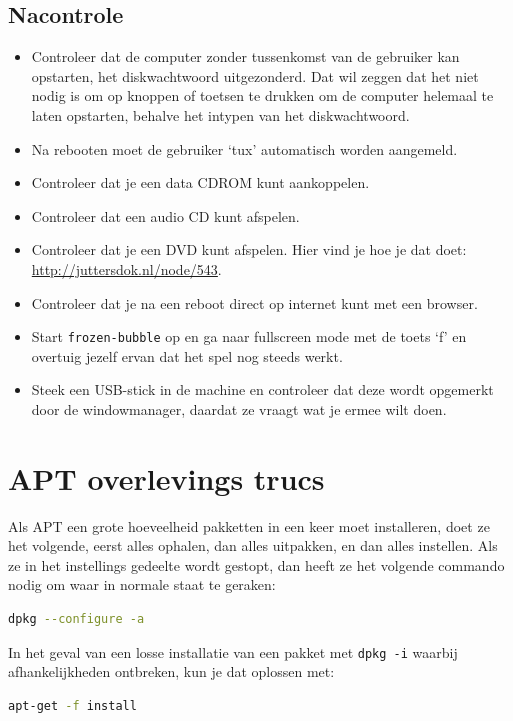 \documentclass[12pt,a4paper]{article}
\begin{document}
\subsection{Nacontrole}
\begin{itemize}
	\item Controleer dat de computer zonder tussenkomst van de gebruiker kan opstarten, het diskwachtwoord uitgezonderd. Dat wil zeggen dat het niet nodig is om op knoppen of toetsen te drukken om de computer helemaal te laten opstarten, behalve het intypen van het diskwachtwoord.
	\item Na rebooten moet de gebruiker `tux' automatisch worden aangemeld.
	\item Controleer dat je een data CDROM kunt aankoppelen.
  \item Controleer dat een audio CD kunt afspelen.
  \item Controleer dat je een DVD kunt afspelen. Hier vind je hoe je dat doet:\\ \url{http://juttersdok.nl/node/543}.
	\item Controleer dat je na een reboot direct op internet kunt met een browser.
	\item Start \texttt{frozen-bubble} op en ga naar fullscreen mode met de toets `f' en overtuig jezelf ervan dat het spel nog steeds werkt.
  \item Steek een USB-stick in de machine en controleer dat deze wordt opgemerkt door de windowmanager, daardat ze vraagt wat je ermee wilt doen.
\end{itemize}
\appendix
\section{APT overlevings trucs}
Als APT een grote hoeveelheid pakketten in een keer moet installeren, doet ze het volgende, eerst alles ophalen, dan alles uitpakken, en dan alles instellen. Als ze in het instellings gedeelte wordt gestopt, dan heeft ze het volgende commando nodig om waar in normale staat te geraken:
\begin{lstlisting}[language=bash]
dpkg --configure -a
\end{lstlisting}

In het geval van een losse installatie van een pakket met \texttt{dpkg -i} waarbij afhankelijkheden ontbreken, kun je dat oplossen met:
\begin{lstlisting}[language=bash]
apt-get -f install
\end{lstlisting}

\end{document}
